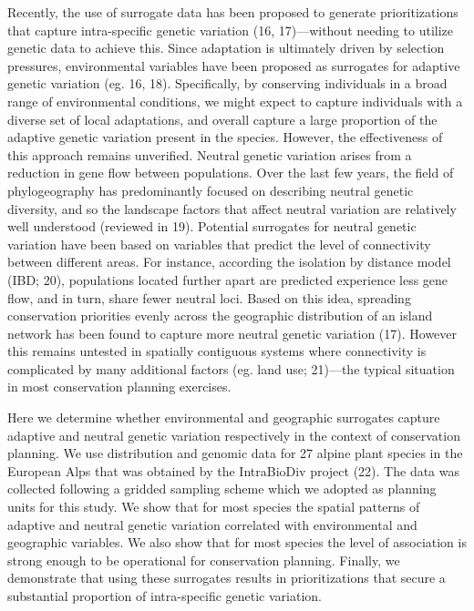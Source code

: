 \documentclass[9pt,twocolumn,twoside,lineno]{pnas-new}
\begin{document}
Recently, the use of surrogate data has been proposed to generate
prioritizations that capture intra-specific genetic variation (16,
17)---without needing to utilize genetic data to achieve this. Since
adaptation is ultimately driven by selection pressures, environmental
variables have been proposed as surrogates for adaptive genetic
variation (eg. 16, 18). Specifically, by conserving individuals in a
broad range of environmental conditions, we might expect to capture
individuals with a diverse set of local adaptations, and overall capture
a large proportion of the adaptive genetic variation present in the
species. However, the effectiveness of this approach remains unverified.
Neutral genetic variation arises from a reduction in gene flow between
populations. Over the last few years, the field of phylogeography has
predominantly focused on describing neutral genetic diversity, and so
the landscape factors that affect neutral variation are relatively well
understood (reviewed in 19). Potential surrogates for neutral genetic
variation have been based on variables that predict the level of
connectivity between different areas. For instance, according the
isolation by distance model (IBD; 20), populations located further apart
are predicted experience less gene flow, and in turn, share fewer
neutral loci. Based on this idea, spreading conservation priorities
evenly across the geographic distribution of an island network has been
found to capture more neutral genetic variation (17). However this
remains untested in spatially contiguous systems where connectivity is
complicated by many additional factors (eg. land use; 21)---the typical
situation in most conservation planning exercises.

Here we determine whether environmental and geographic surrogates
capture adaptive and neutral genetic variation respectively in the
context of conservation planning. We use distribution and genomic data
for 27 alpine plant species in the European Alps that was obtained by
the IntraBioDiv project (22). The data was collected following a gridded
sampling scheme which we adopted as planning units for this study. We
show that for most species the spatial patterns of adaptive and neutral
genetic variation correlated with environmental and geographic
variables. We also show that for most species the level of association
is strong enough to be operational for conservation planning. Finally,
we demonstrate that using these surrogates results in prioritizations
that secure a substantial proportion of intra-specific genetic
variation.
\end{document}
